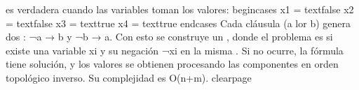 {}es verdadera cuando las variables toman los valores:\markdownRendererHardLineBreak
{}\markdownRendererDollarSign{}\markdownRendererDollarSign{}\markdownRendererSoftLineBreak
{}\markdownRendererBackslash{}begin\markdownRendererLeftBrace{}cases\markdownRendererRightBrace{}\markdownRendererSoftLineBreak
{}x\markdownRendererUnderscore{}1 = \markdownRendererBackslash{}text\markdownRendererLeftBrace{}false\markdownRendererRightBrace{} \markdownRendererBackslash{}\markdownRendererBackslash{}\markdownRendererSoftLineBreak
{}x\markdownRendererUnderscore{}2 = \markdownRendererBackslash{}text\markdownRendererLeftBrace{}false\markdownRendererRightBrace{} \markdownRendererBackslash{}\markdownRendererBackslash{}\markdownRendererSoftLineBreak
{}x\markdownRendererUnderscore{}3 = \markdownRendererBackslash{}text\markdownRendererLeftBrace{}true\markdownRendererRightBrace{} \markdownRendererBackslash{}\markdownRendererBackslash{}\markdownRendererSoftLineBreak
{}x\markdownRendererUnderscore{}4 = \markdownRendererBackslash{}text\markdownRendererLeftBrace{}true\markdownRendererRightBrace{}\markdownRendererSoftLineBreak
{}\markdownRendererBackslash{}end\markdownRendererLeftBrace{}cases\markdownRendererRightBrace{}\markdownRendererSoftLineBreak
{}\markdownRendererDollarSign{}\markdownRendererDollarSign{}\markdownRendererParagraphSeparator
{}Cada cláusula \markdownRendererDollarSign{}(a \markdownRendererBackslash{}lor b)\markdownRendererDollarSign{} genera dos : ¬a → b y ¬b → a. Con esto se construye un , donde el problema es  si existe una variable \markdownRendererDollarSign{}x\markdownRendererUnderscore{}i\markdownRendererDollarSign{} y su negación ¬\markdownRendererDollarSign{}x\markdownRendererUnderscore{}i\markdownRendererDollarSign{} en la misma .\markdownRendererHardLineBreak
{}Si no ocurre, la fórmula tiene solución, y los valores se obtienen procesando las componentes en orden topológico inverso. Su complejidad es \markdownRendererDollarSign{}O(n+m)\markdownRendererDollarSign{}.\markdownRendererParagraphSeparator
{}\markdownRendererDollarSign{}\markdownRendererBackslash{}clearpage\markdownRendererDollarSign{}\markdownRendererInterblockSeparator
{}\markdownRendererParagraphSeparator
{}
\markdownRendererSectionEnd \markdownRendererSectionBegin
{}\markdownRendererInterblockSeparator
